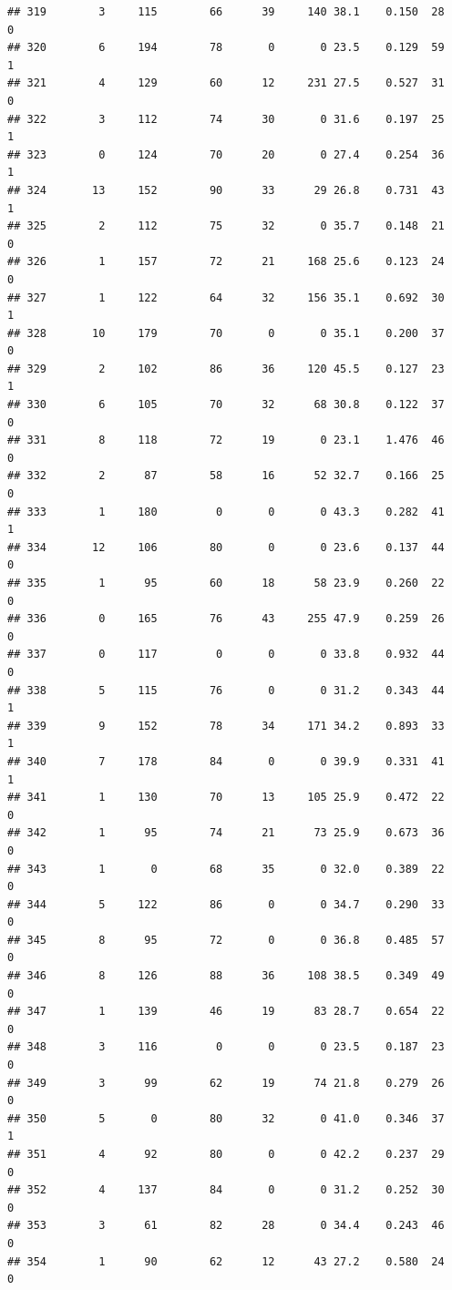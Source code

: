 \documentclass[11pt, a4paper]{article}\usepackage[]{graphicx}\usepackage[]{xcolor}
\makeatletter
\newenvironment{kframe}{%
 \def\at@end@of@kframe{}%
 \ifinner\ifhmode%
  \def\at@end@of@kframe{\end{minipage}}%
  \begin{minipage}{\columnwidth}%
 \fi\fi%
 \def\FrameCommand##1{\hskip\@totalleftmargin \hskip-\fboxsep
 \colorbox{shadecolor}{##1}\hskip-\fboxsep
     \hskip-\linewidth \hskip-\@totalleftmargin \hskip\columnwidth}%
 \MakeFramed {\advance\hsize-\width
   \@totalleftmargin\z@ \linewidth\hsize
   \@setminipage}}%
 {\par\unskip\endMakeFramed%
 \at@end@of@kframe}
\newenvironment{knitrout}{}{} %
\makeatother
\begin{document}
\begin{knitrout}
\begin{kframe}
\begin{verbatim}
## 319        3     115        66      39     140 38.1    0.150  28    0
## 320        6     194        78       0       0 23.5    0.129  59    1
## 321        4     129        60      12     231 27.5    0.527  31    0
## 322        3     112        74      30       0 31.6    0.197  25    1
## 323        0     124        70      20       0 27.4    0.254  36    1
## 324       13     152        90      33      29 26.8    0.731  43    1
## 325        2     112        75      32       0 35.7    0.148  21    0
## 326        1     157        72      21     168 25.6    0.123  24    0
## 327        1     122        64      32     156 35.1    0.692  30    1
## 328       10     179        70       0       0 35.1    0.200  37    0
## 329        2     102        86      36     120 45.5    0.127  23    1
## 330        6     105        70      32      68 30.8    0.122  37    0
## 331        8     118        72      19       0 23.1    1.476  46    0
## 332        2      87        58      16      52 32.7    0.166  25    0
## 333        1     180         0       0       0 43.3    0.282  41    1
## 334       12     106        80       0       0 23.6    0.137  44    0
## 335        1      95        60      18      58 23.9    0.260  22    0
## 336        0     165        76      43     255 47.9    0.259  26    0
## 337        0     117         0       0       0 33.8    0.932  44    0
## 338        5     115        76       0       0 31.2    0.343  44    1
## 339        9     152        78      34     171 34.2    0.893  33    1
## 340        7     178        84       0       0 39.9    0.331  41    1
## 341        1     130        70      13     105 25.9    0.472  22    0
## 342        1      95        74      21      73 25.9    0.673  36    0
## 343        1       0        68      35       0 32.0    0.389  22    0
## 344        5     122        86       0       0 34.7    0.290  33    0
## 345        8      95        72       0       0 36.8    0.485  57    0
## 346        8     126        88      36     108 38.5    0.349  49    0
## 347        1     139        46      19      83 28.7    0.654  22    0
## 348        3     116         0       0       0 23.5    0.187  23    0
## 349        3      99        62      19      74 21.8    0.279  26    0
## 350        5       0        80      32       0 41.0    0.346  37    1
## 351        4      92        80       0       0 42.2    0.237  29    0
## 352        4     137        84       0       0 31.2    0.252  30    0
## 353        3      61        82      28       0 34.4    0.243  46    0
## 354        1      90        62      12      43 27.2    0.580  24    0

\end{verbatim}
\end{kframe}
\end{knitrout}
\end{document}

